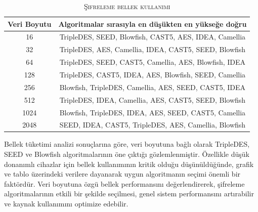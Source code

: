 \documentclass[conference, a4paper]{IEEEtran}
\begin{document}
    \begin{table}[h]
        \centering
        \caption{\textsc{Şifreleme bellek kullanımı}}
        \label{tablo2}
        \begin{tabular}{|c|c|}
            \hline
                Veri Boyutu & Algoritmalar sırasıyla en düşükten en yükseğe doğru \\
            \hline
            16 & TripleDES, SEED, Blowfish, CAST5, AES, IDEA, Camellia \\
            \hline
            32 & TripleDES, AES, Camellia, IDEA, CAST5, SEED, Blowfish \\
            \hline
            64 & TripleDES, SEED, CAST5, Camellia, AES, Blowfish, IDEA \\
            \hline
            128 & TripleDES, CAST5, IDEA, AES, Blowfish, SEED, Camellia \\
            \hline
            256 & Blowfish, TripleDES, Camellia, AES, SEED, CAST5, IDEA \\
            \hline
            512 & TripleDES, IDEA, Camellia, AES, CAST5, SEED, Blowfish \\
            \hline
            1024 & Blowfish, TripleDES, IDEA, AES, SEED, CAST5, Camellia \\
            \hline
            2048 & SEED, IDEA, CAST5, TripleDES, AES, Camellia, Blowfish \\
            \hline
        \end{tabular}
    \end{table}

    Bellek tüketimi analizi sonuçlarına göre, veri boyutuna bağlı olarak TripleDES, SEED ve Blowfish algoritmalarının öne çıktığı gözlemlenmiştir. Özellikle düşük donanımlı cihazlar için bellek kullanımının kritik olduğu düşünüldüğünde, grafik ve tablo üzerindeki verilere dayanarak uygun algoritmanın seçimi önemli bir faktördür. Veri boyutuna özgü bellek performansını değerlendirerek, şifreleme algoritmalarının etkili bir şekilde seçilmesi, genel sistem performansını artırabilir ve kaynak kullanımını optimize edebilir.
\end{document}
